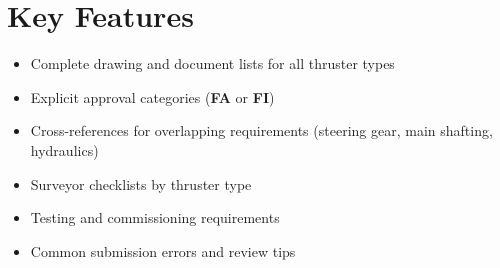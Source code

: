 \documentclass[11pt,a4paper]{report}
\newcommand{\fa}{\textbf{\textcolor{warningred}{FA}}}
\newcommand{\fic}{\textbf{\textcolor{bvgray}{FI}}}
\begin{document}
\section*{Key Features}
\begin{itemize}[leftmargin=*]
    \item Complete drawing and document lists for all thruster types
    \item Explicit approval categories (\fa{} or \fic{})
    \item Cross-references for overlapping requirements (steering gear, main shafting, hydraulics)
    \item Surveyor checklists by thruster type
    \item Testing and commissioning requirements
    \item Common submission errors and review tips
\end{itemize}
\end{document}
